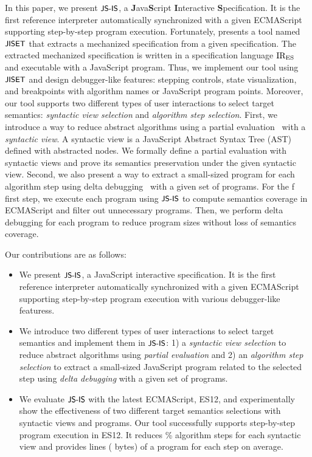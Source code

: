 In this paper, we present $\textsf{\small JS-IS}$, a \textbf{J}ava\textbf{S}cript
\textbf{I}nteractive \textbf{S}pecification. It is the first reference
interpreter automatically synchronized with a given ECMAScript supporting
step-by-step program execution. Fortunately, \citet{jiset} presents a tool named
$\textsf{\small JISET}$ that extracts a mechanized specification from a given specification.
The extracted mechanized specification is written in a specification language
$\text{IR}_\text{ES}$ and executable with a JavaScript program. Thus, we implement our tool
using $\textsf{\small JISET}$ and design debugger-like features: stepping controls, state
visualization, and breakpoints with algorithm names or JavaScript program
points. Moreover, our tool supports two different types of user interactions to
select target semantics: \textit{syntactic view selection} and \textit{algorithm
step selection}. First, we introduce a way to reduce abstract algorithms using a
partial evaluation~\cite{peval, peval-survey, trans-ai} with a \textit{syntactic
view}. A syntactic view is a JavaScript Abstract Syntax Tree (AST) defined with
abstracted nodes. We formally define a partial evaluation with syntactic views
and prove its semantics preservation under the given syntactic view. Second, we
also present a way to extract a small-sized program for each algorithm step
using delta debugging~\cite{delta-debugging} with a given set of programs. For
the f first step, we execute each program using $\textsf{\small JS-IS}$ to compute semantics
coverage in ECMAScript and filter out unnecessary programs. Then, we perform
delta debugging for each program to reduce program sizes without loss of
semantics coverage.

Our contributions are as follows:
\begin{itemize}
  \item We present $\textsf{\small JS-IS}$, a JavaScript interactive specification. It is the
    first reference interpreter automatically synchronized with a given
    ECMAScript supporting step-by-step program execution with various
    debugger-like featuress.

  \item We introduce two different types of user interactions to select target
    semantics and implement them in $\textsf{\small JS-IS}$: 1) a \textit{syntactic view
    selection} to reduce abstract algorithms using \textit{partial evaluation}
    and 2) an \textit{algorithm step selection} to extract a small-sized
    JavaScript program related to the selected step using \textit{delta
    debugging} with a given set of programs.

  \item We evaluate $\textsf{\small JS-IS}$ with the latest ECMAScript, ES12, and experimentally
    show the effectiveness of two different target semantics selections with
     syntactic views and  programs. Our tool
    successfully supports step-by-step program execution in ES12. It reduces
    \% algorithm steps for each syntactic view and provides
     lines ( bytes) of a program for each step on
    average.
\end{itemize}
